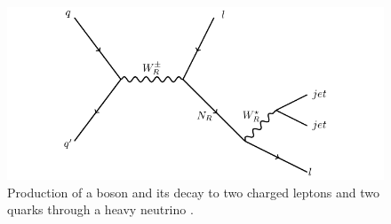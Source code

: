 

\begin{figure}[h]
	\centering
	\includegraphics[width=1.0\textwidth]{figures/feynman.pdf}
	\caption{Production of a \WR boson and its decay to two charged leptons and two quarks through 
	a heavy neutrino \nul.}
	\label{fig:wrFeynmanDiagram}
\end{figure}

